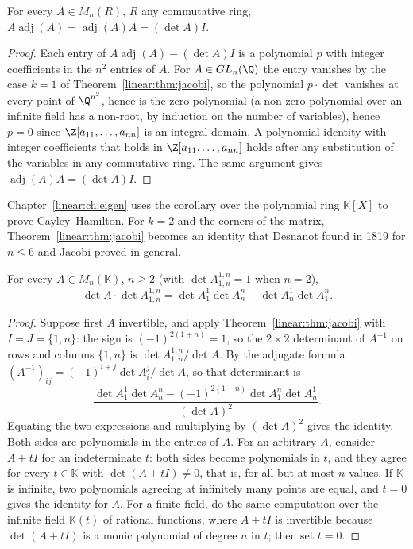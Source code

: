 \begin{corollary}\label{linear:cor:adjugate}
For every $A\in M_n(R)$, $R$ any commutative ring, $A\operatorname{adj}(A)=\operatorname{adj}(A)A=(\det A)I$.
\end{corollary}
\begin{proof}
Each entry of $A\operatorname{adj}(A)-(\det A)I$ is a polynomial $p$ with integer coefficients in the $n^2$ entries of $A$.
For $A\in GL_n(\Q)$ the entry vanishes by the case $k=1$ of Theorem~\ref{linear:thm:jacobi}, so the polynomial $p\cdot\det$
vanishes at every point of $\Q^{n^2}$, hence is the zero polynomial (a non-zero polynomial over an infinite field has a
non-root, by induction on the number of variables), hence $p=0$ since $\Z[a_{11},\dots,a_{nn}]$ is an integral domain.
A polynomial identity with integer coefficients that holds in $\Z[a_{11},\dots,a_{nn}]$ holds after any substitution
of the variables in any commutative ring. The same argument gives $\operatorname{adj}(A)A=(\det A)I$.
\end{proof}

Chapter~\ref{linear:ch:eigen} uses the corollary over the polynomial ring $\mathbb K[X]$ to prove Cayley--Hamilton. For $k=2$ and
the corners of the matrix, Theorem~\ref{linear:thm:jacobi} becomes an identity that Desnanot found in 1819 for $n\le6$ and
Jacobi proved in general.

\begin{theorem}\label{linear:thm:desnanot}
For every $A\in M_n(\mathbb K)$, $n\ge2$ (with $\det A^{1,n}_{1,n}=1$ when $n=2$),
\[
\det A\cdot\det A^{1,n}_{1,n}=\det A^1_1\det A^n_n-\det A^1_n\det A^n_1.
\]
\end{theorem}
\begin{proof}
Suppose first $A$ invertible, and apply Theorem~\ref{linear:thm:jacobi} with $I=J=\{1,n\}$: the sign is $(-1)^{2(1+n)}=1$, so the
$2\times2$ determinant of $A^{-1}$ on rows and columns $\{1,n\}$ is $\det A^{1,n}_{1,n}/\det A$. By the adjugate formula
$(A^{-1})_{ij}=(-1)^{i+j}\det A^j_i/\det A$, so that determinant is
\[
\frac{\det A^1_1\det A^n_n-(-1)^{2(1+n)}\det A^n_1\det A^1_n}{(\det A)^2}.
\]
Equating the two expressions and multiplying by $(\det A)^2$ gives the identity. Both sides are polynomials in the
entries of $A$. For an arbitrary $A$, consider $A+tI$ for an indeterminate $t$: both sides become polynomials in $t$, and
they agree for every $t\in\mathbb K$ with $\det(A+tI)\ne0$, that is, for all but at most $n$ values. If $\mathbb K$ is
infinite, two polynomials agreeing at infinitely many points are equal, and $t=0$ gives the identity for $A$. For a finite
field, do the same computation over the infinite field $\mathbb K(t)$ of rational functions, where $A+tI$ is invertible
because $\det(A+tI)$ is a monic polynomial of degree $n$ in $t$; then set $t=0$.
\end{proof}

